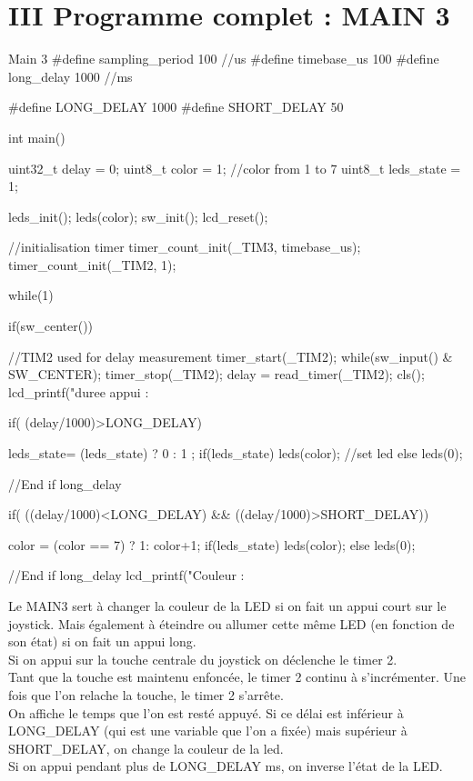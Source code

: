 \section{III Programme complet : MAIN 3}
\begin{Cpp}{Main 3} 
#define sampling_period 100         //us
#define timebase_us     100
#define long_delay      1000        //ms

#define LONG_DELAY 1000
#define SHORT_DELAY 50


int main()
{
    uint32_t delay = 0;
    uint8_t color = 1;  //color from 1 to 7
    uint8_t leds_state = 1;

    
    leds_init();
    leds(color);
    sw_init();
    lcd_reset();
    
    //initialisation timer
    timer_count_init(_TIM3, timebase_us);
    timer_count_init(_TIM2, 1);
    
    while(1)
    {

        if(sw_center())
        {
            //TIM2 used for delay measurement
            timer_start(_TIM2);
            while(sw_input() & SW_CENTER);
            timer_stop(_TIM2);
            delay = read_timer(_TIM2);
            cls();
            lcd_printf("duree appui : %

            if( (delay/1000)>LONG_DELAY) {
                leds_state= (leds_state) ? 0 : 1 ;
                if(leds_state) {
                    leds(color);
                }
                //set led
                else {
                    leds(0);
                }

            }//End if long_delay

            if( ((delay/1000)<LONG_DELAY) && ((delay/1000)>SHORT_DELAY)) {
                color = (color == 7) ? 1: color+1;
                if(leds_state) {
                    leds(color);
                }
                else {
                    leds(0);
                }
  
            }//End if long_delay
           lcd_printf("Couleur : %
        }
    }        
}
\end{Cpp}

Le MAIN3 sert à changer la couleur de la LED si on fait un appui court sur le joystick. Mais également à éteindre ou allumer cette même LED (en fonction de son état) si on fait un appui long.\\

Si on appui sur la touche centrale du joystick on déclenche le timer 2.\\
Tant que la touche est maintenu enfoncée, le timer 2 continu à s'incrémenter.
Une fois que l'on relache la touche, le timer 2 s'arrête.\\
On affiche le temps que l'on est resté appuyé.
Si ce délai est inférieur à LONG\_DELAY (qui est une variable que l'on a fixée) mais supérieur à SHORT\_DELAY, on change la couleur de la led.\\
Si on appui pendant plus de LONG\_DELAY ms, on inverse l'état de la LED.

